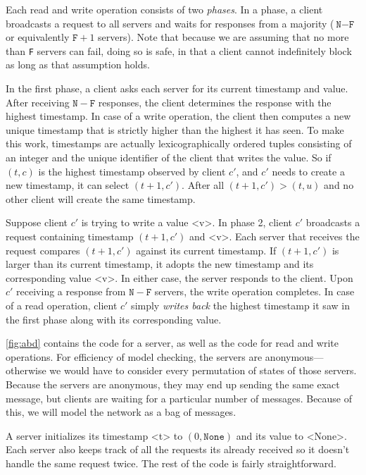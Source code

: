 \documentclass{report}
\begin{document}
{Each read and write operation consists of two \emph{phases}.  In a phase,
a client broadcasts a request to all servers and waits for responses
from a majority ($\texttt{N} - \texttt{F}$ or equivalently
$\texttt{F} + 1$ servers).  Note that because we are assuming that no
more than \texttt{F} servers can fail, doing so is safe, in that a client
cannot indefinitely block as long as that assumption holds.

In the first phase, a client asks each server for its current
timestamp and value.  After receiving $\mathtt{N} - \mathtt{F}$ responses,
the client determines the response with the highest timestamp.
In case of a write operation, the client then computes a new unique
timestamp that is strictly higher than the highest it has seen.
To make this work, timestamps are actually lexicographically ordered
tuples consisting of an integer and the unique identifier of the
client that writes the value.  So if $(t, c)$ is the highest timestamp
observed by client $c'$, and $c'$  needs to create a new timestamp,
it can select $(t + 1, c')$.
After all $(t + 1, c') > (t, u)$ and no other client
will create the same timestamp.

Suppose client $c'$ is trying to write a value <{v}>.
In phase 2, client $c'$ broadcasts a request containing timestamp $(t+1, c')$
and <{v}>.  Each server that receives the request compares $(t+1, c')$ against
its current timestamp.  If $(t+1, c')$ is larger than its current timestamp,
it adopts the new timestamp and its corresponding value <{v}>.  In either case,
the server responds to the client.
Upon $c'$ receiving a response from $\mathtt{N} - \mathtt{F}$ servers,
the write operation completes.
In case of a read operation, client $c'$ simply \emph{writes back} the
highest timestamp it saw in the first phase along with its corresponding value.

\autoref{fig:abd} contains the code for a server, as well as the code
for read and write operations.
For efficiency of model checking, the servers are anonymous---otherwise
we would have to consider every permutation of states of those servers.
Because the servers are anonymous, they may end up sending the same
exact message, but clients are waiting for a particular number of
messages.
Because of this, we will model the network as a bag of messages.

A server initializes its timestamp <{t}> to
$(0, \mathtt{None})$ and its value to <{None}>.
Each server also keeps track of all the requests its already received
so it doesn't handle the same request twice.
The rest of the code is fairly straightforward.

}
\end{document}
